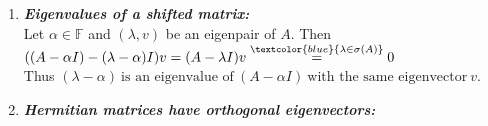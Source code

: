 {\begin{enumerate}
%
%
%
	\item\textbf{\textit{Eigenvalues of a shifted matrix:}}\\ 
		Let $\alpha\in\mathbb{F}$ and $(\lambda,v)$ be an eigenpair of $A$. Then $((A-\alpha I)-(\lambda -\alpha)I)v=(A-\lambda I)v\stackrel{\textcolor{blue}{\lambda\in\sigma(A)}}{=}0$\\
	 Thus ${(\lambda-\alpha)~\text{is an eigenvalue of}~(A-\alpha I)~\text{with the same eigenvector}~v}$.
	\item \textbf{\textit{Hermitian matrices have orthogonal eigenvectors:}}\\ 

\end{enumerate}}
